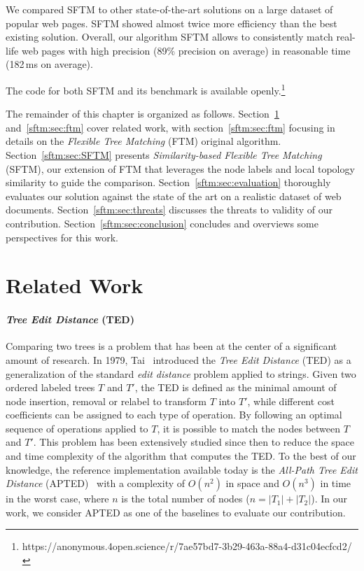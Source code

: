 We compared SFTM to other state-of-the-art solutions on a large dataset of popular web pages.
SFTM showed almost twice more efficiency than the best existing solution.
Overall, our algorithm SFTM allows to consistently match real-life web pages with high precision (89\% precision on average) in reasonable time (182\,ms on average).

The code for both SFTM and its benchmark is available openly.\footnote{https://anonymous.4open.science/r/7ae57bd7-3b29-463a-88a4-d31c04ecfcd2/}

The remainder of this chapter is organized as follows.
Section~\ref{sftm:sec:related_work} and~\ref{sftm:sec:ftm} cover related work, with section~\ref{sftm:sec:ftm} focusing in details on the \emph{Flexible Tree Matching} (FTM) original algorithm.
Section~\ref{sftm:sec:SFTM} presents \emph{Similarity-based Flexible Tree Matching} (SFTM), our extension of FTM that leverages the node labels and local topology similarity to guide the comparison.
Section~\ref{sftm:sec:evaluation} thoroughly evaluates our solution against the state of the art on a realistic dataset of web documents.
Section~\ref{sftm:sec:threats} discusses the threats to validity of our contribution.
Section~\ref{sftm:sec:conclusion} concludes and overviews some perspectives for this work.

\section{Related Work}\label{sftm:sec:related_work}
\paragraph{\bf \emph{Tree Edit Distance} (TED)}\label{sftm:sec:ted}
Comparing two trees is a problem that has been at the center of a significant amount of research.
In 1979, Tai~\cite{Tai1979} introduced the \emph{Tree Edit Distance} (TED) as a generalization of the standard \emph{edit distance} problem applied to strings.
Given two ordered labeled trees $T$ and $T'$, the TED is defined as the minimal amount of node insertion, removal or relabel to transform $T$ into $T'$, while different cost coefficients can be assigned to each type of operation.
By following an optimal sequence of operations applied to $T$, it is possible to match the nodes between $T$ and $T'$.
This problem has been extensively studied since then to reduce the space and time complexity of the algorithm that computes the TED.
To the best of our knowledge, the reference implementation available today is the \emph{All-Path Tree Edit Distance} (APTED)~\cite{Pawlik2011, pawlik2015efficient, pawlik2016tree} with a complexity of $O(n^2)$ in space and $O(n^3)$ in time in the worst case, where $n$ is the total number of nodes ($n = |T_1|+|T_2|$).
In our work, we consider APTED as one of the baselines to evaluate our contribution.

